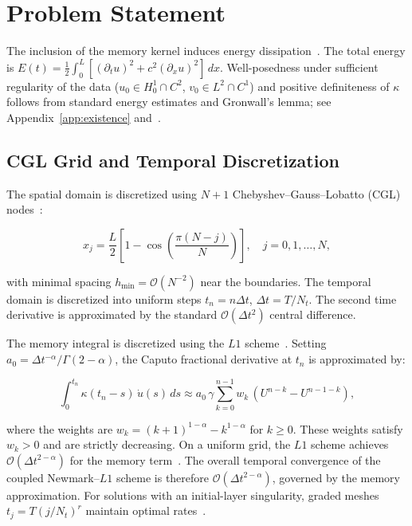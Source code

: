 \documentclass[a4paper,fleqn]{cas-sc}
\begin{document}
\section{Problem Statement}\label{sec:existence}
The inclusion of the memory kernel induces energy dissipation~\cite{ref15}. The total energy is $E(t) = \frac{1}{2} \int_0^L [(\partial_t u)^2 + c^2 (\partial_x u)^2]\, dx$. Well-posedness under sufficient regularity of the data ($u_0 \in H_0^1 \cap C^2$, $v_0 \in L^2 \cap C^1$) and positive definiteness of $\kappa$ follows from standard energy estimates and Gronwall's lemma; see Appendix~\ref{app:existence} and~\cite{sakamoto2011,mclean2010}.

\subsection{CGL Grid and Temporal Discretization}\label{sec:space_disc}
The spatial domain is discretized using $N+1$ Chebyshev--Gauss--Lobatto (CGL) nodes~\cite{ref5}:
\begin{linenomath}
\begin{equation}\label{eq:cgl}
  x_j = \frac{L}{2} \left[1 - \cos\left(\frac{\pi (N-j)}{N}\right)\right], \quad j = 0, 1, \ldots, N,
\end{equation}
\end{linenomath}
with minimal spacing $h_{\min} = \mathcal{O}(N^{-2})$ near the boundaries. The temporal domain is discretized into uniform steps $t_n = n \Delta t$, $\Delta t = T/N_t$. The second time derivative is approximated by the standard $\mathcal{O}(\Delta t^2)$ central difference.

The memory integral is discretized using the $L1$ scheme~\cite{ref21,jin2016}. Setting $a_0 = \Delta t^{-\alpha}/\Gamma(2-\alpha)$, the Caputo fractional derivative at $t_n$ is approximated by:
\begin{linenomath}
\begin{equation}\label{eq:l2sigma}
\int_0^{t_n}\kappa(t_n-s)\,\dot{u}(s)\,ds \approx a_0\,\gamma\sum_{k=0}^{n-1}w_{k}\,(U^{n-k}-U^{n-1-k}),
\end{equation}
\end{linenomath}
where the weights are $w_k = (k+1)^{1-\alpha} - k^{1-\alpha}$ for $k \ge 0$. These weights satisfy $w_k > 0$ and are strictly decreasing. On a uniform grid, the $L1$ scheme achieves $\mathcal{O}(\Delta t^{2-\alpha})$ for the memory term~\cite{jin2016,liao2018sharp}. The overall temporal convergence of the coupled Newmark--$L1$ scheme is therefore $\mathcal{O}(\Delta t^{2-\alpha})$, governed by the memory approximation. For solutions with an initial-layer singularity, graded meshes $t_j = T(j/N_t)^r$ maintain optimal rates~\cite{stynes2017,liao2018sharp}.
\end{document}
